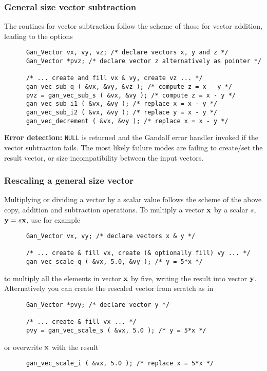 \subsubsection{General size vector subtraction}
The routines for vector subtraction follow the scheme of those for
vector addition, leading to the options
\begin{verbatim}
      Gan_Vector vx, vy, vz; /* declare vectors x, y and z */
      Gan_Vector *pvz; /* declare vector z alternatively as pointer */

      /* ... create and fill vx & vy, create vz ... */
      gan_vec_sub_q ( &vx, &vy, &vz ); /* compute z = x - y */
      pvz = gan_vec_sub_s ( &vx, &vy ); /* compute z = x - y */
      gan_vec_sub_i1 ( &vx, &vy ); /* replace x = x - y */
      gan_vec_sub_i2 ( &vx, &vy ); /* replace y = x - y */
      gan_vec_decrement ( &vx, &vy ); /* replace x = x - y */
\end{verbatim}

{\bf Error detection:} {\tt NULL} is returned and the Gandalf error handler
invoked if the vector subtraction fails.
The most likely failure modes are failing to create/set the result vector,
or size incompatibility between the input vectors.

\subsubsection{Rescaling a general size vector}
Multiplying or dividing a vector by a scalar value follows the scheme of the
above copy, addition and subtraction operations. To multiply a vector ${\bf x}$
by a scalar $s$, ${\bf y}=s{\bf x}$, use for example
\begin{verbatim}
      Gan_Vector vx, vy; /* declare vectors x & y */

      /* ... create & fill vx, create (& optionally fill) vy ... */
      gan_vec_scale_q ( &vx, 5.0, &vy ); /* y = 5*x */
\end{verbatim}
to multiply all the elements in vector ${\bf x}$ by five, writing the result
into vector ${\bf y}$.
Alternatively you can create the rescaled vector from scratch as in
\begin{verbatim}
      Gan_Vector *pvy; /* declare vector y */

      /* ... create & fill vx ... */
      pvy = gan_vec_scale_s ( &vx, 5.0 ); /* y = 5*x */
\end{verbatim}
or overwrite ${\bf x}$ with the result
\begin{verbatim}
      gan_vec_scale_i ( &vx, 5.0 ); /* replace x = 5*x */
\end{verbatim}

